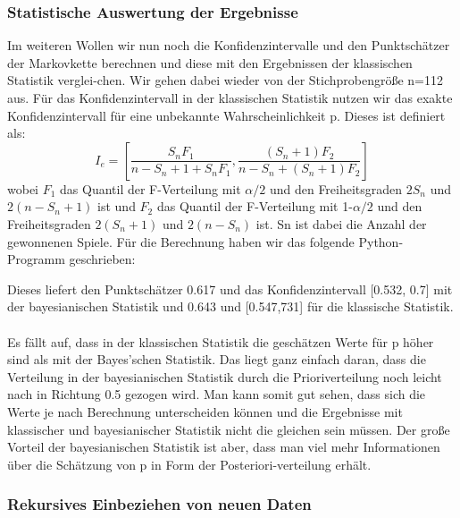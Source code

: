 \documentclass[a4paper,12pt]{article}
\begin{document}
\newpage
\subsubsection{Statistische Auswertung der Ergebnisse}

Im weiteren Wollen wir nun noch die Konfidenzintervalle und den Punktschätzer der Markovkette berechnen und diese mit den Ergebnissen der klassischen Statistik verglei-chen. Wir gehen dabei wieder von der Stichprobengröße n=112 aus. Für das Konfidenzintervall in der klassischen Statistik nutzen wir das exakte Konfidenzintervall für eine unbekannte Wahrscheinlichkeit p. Dieses ist definiert als:
\begin{equation}
  I_e = \left[\frac{S_nF_1}{n-S_n+1+S_nF_1} , \frac{(S_n+1)F_2}{n-S_n+(S_n+1)F_2}\right]
\end{equation}
wobei $F_1$ das Quantil der F-Verteilung mit $\alpha/2$ und den Freiheitsgraden $2S_n$ und $2(n-S_n+1)$ ist und $F_2$ das Quantil der F-Verteilung mit 1-$\alpha/2$ und den Freiheitsgraden $2(S_n+1)$ und $2(n-S_n)$ ist. Sn ist dabei die Anzahl der gewonnenen Spiele. Für die Berechnung haben wir das folgende Python-Programm geschrieben:


\noindent Dieses liefert den Punktschätzer 0.617 und das Konfidenzintervall [0.532, 0.7] mit der bayesianischen Statistik und 0.643 und [0.547,731] für die klassische Statistik. \\\\
Es fällt auf, dass in der klassischen Statistik die geschätzen Werte für p höher sind als mit der Bayes'schen Statistik. Das liegt ganz einfach daran, dass die Verteilung in der bayesianischen Statistik durch die Prioriverteilung noch leicht nach in Richtung 0.5 gezogen wird. Man kann somit gut sehen, dass sich die Werte je nach Berechnung unterscheiden können und die Ergebnisse mit klassischer und bayesianischer Statistik nicht die gleichen sein müssen. Der große Vorteil der bayesianischen Statistik ist aber, dass man viel mehr Informationen über die Schätzung von p in Form der Posteriori-verteilung erhält.

\newpage
\subsubsection{Rekursives Einbeziehen von neuen Daten}
\end{document}
